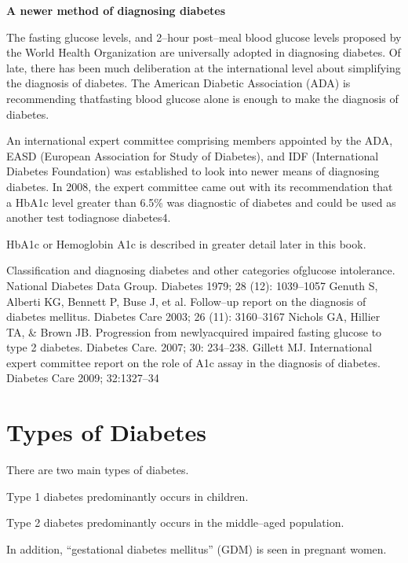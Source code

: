 \noindent
\textbf{A newer method of diagnosing diabetes}

The fasting glucose levels, and 2–hour post–meal blood glu\-cose le\-vels proposed by the World Health Organization are universally ado\-pted in diagnosing diabetes. Of late, there has been much deliberation at the international level about simplifying the diagnosis of diabetes. The American Diabetic Association (ADA) is recommending that\break fasting blood glucose alone is enough to make the diagnosis of diabetes.


An international expert committee comprising members appoin\-ted by the ADA, EASD (European Association for Study of Diabetes), and IDF (International Diabetes Foundation) was established to look into newer means of diagnosing diabetes. In 2008, the expert commi\-ttee came out with its recommendation that a HbA1c level greater than 6.5\% was diagnostic of diabetes and could be used as another test to\break diagnose diabetes4.

HbA1c or Hemoglobin A1c is described in greater detail later in this book.

\begin{thebibliography}{99}
 Classification and diagnosing diabetes and other categories of\break glucose intolerance. National Diabetes Data Group. Diabetes 1979; 28 (12): 1039–1057
  Genuth S, Alberti KG, Bennett P, Buse J, et al. Follow–up report on the diagnosis of diabetes mellitus. Diabetes Care 2003; 26 (11): 3160–3167
  Nichols GA, Hillier TA, \& Brown JB. Progression from newly\break acquired impaired fasting glucose to type 2 diabetes. Diabetes Care. 2007; 30: 234–238.
  Gillett MJ. International expert committee report on the role of A1c assay in the diagnosis of diabetes. Diabetes Care 2009; 32:1327–34
 \end{thebibliography}


\chapter{Types of Diabetes}\label{chap6}

There are two main types of diabetes.

Type 1 diabetes predominantly occurs in children.

Type 2 diabetes predominantly occurs in the middle–aged popu\-lation.

In addition, “gestational diabetes mellitus” (GDM) is seen in pregnant women.

